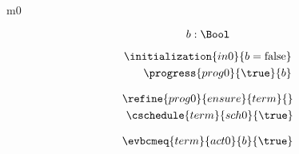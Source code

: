 \documentclass{article}
\begin{document}
	
\begin{machine}{m0}
	
\[
\variable{ b : \Bool }
\]
\begin{description}
\end{description}

\begin{align}
\initialization{in0}{b = \false} \\
\progress{prog0}{\true}{b}
\end{align}

\begin{align}
\refine{prog0}{ensure}{term}{} \\
\cschedule{term}{sch0}{\true} 
\end{align}

\begin{align}
\evbcmeq{term}{act0}{b}{\true}
\end{align}


\end{machine}

\newcommand{\Pcs}{\text{P}}
\end{document}
